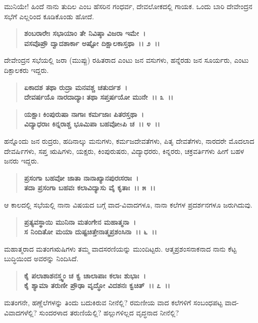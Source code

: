 ಮುನಿಯೇ! ಹಿಂದೆ ನಾನು ತುದಿಲ ಎಂಬ ಹೆಸರಿನ ಗಂಧರ್ವ, ದೇವಲೋಕದಲ್ಲಿ ಗಾಯಕ. ಒಂದು ಬಾರಿ ದೇವೇಂದ್ರನ ಸಭೆಗೆ ಎಲ್ಲರಿಂದ ಕೂಡಿಕೊಂಡು ಹೋದೆ.

\begin{verse}
\textbf{ಶಂಬರಾರೇಃ ಸಭಾಯಾಂ ತೇ ನಿವಿಷ್ಠಾ ವಿಜರಾ ಇಮೇ~।}\\\textbf{ವಸವೊಪ್ರೌ ದ್ವಾದಶಾರ್ಕಾ ಅಷ್ಟೋ ದಿಕ್ಷಾಲಕಾಸ್ತಥಾ~।। ೨~।। }
\end{verse}

ದೇವೇಂದ್ರನ ಸಭೆಯಲ್ಲಿ ಜರಾ (ಮುಪ್ಪು) ರಹಿತರಾದ ಎಂಟು ಜನ ವಸುಗಳು, ಹನ್ನೆರಡು ಜನ ಸೂರ್ಯರು, ಎಂಟು ದಿಕ್ಪಾಲಕರು ಇದ್ದರು.

\begin{verse}
\textbf{ಏಕಾದಶ ತಥಾ ರುದ್ರಾ ಮನವಶ್ಚ ಚತುರ್ದಶ~।}\\\textbf{ದೇವರ್ಷಯೊ ನಾರದಾದ್ಯಾಃ ತಥಾ ಸಪ್ತರ್ಷಯೋ ಮುನೇ~।। ೩~।। }
\end{verse}

\begin{verse}
\textbf{ಯಕ್ಷಾಃ ಕಿಂಪುರುಷಾ ನಾಗಾಃ ಕರ್ಮಜಾಃ ಪಿತರಸ್ತಥಾ~।}\\\textbf{ವಿದ್ಯಾಧರಾಃ ಕಿನ್ನರಾಶ್ಚ ಭೂಮಿಪಾ ಬಹವೋsಪಿ ಚ~।। ೪~।। }
\end{verse}

ಹನ್ನೊಂದು ಜನ ರುದ್ರರು, ಹದಿನಾಲ್ಕು ಮನುಗಳು, ಕರ್ಮಜದೇವತೆಗಳು, ಪಿತೃ ದೇವತೆಗಳು, ನಾರದರೇ ಮೊದಲಾದ ದೇವಷಿ೯ಗಳು, ಸಪ್ತ ಋಷಿಗಳು, ಯಕ್ಷರು, ಕಿಂಪುರುಷರು, ವಿದ್ಯಾಧರರು, ಕಿನ್ನರರು, ಚಕ್ರವರ್ತಿಗಳು ಹೀಗೆ ಬಹಳ ಜನರು ಇದ್ದರು.

\begin{verse}
\textbf{ಪ್ರಸಂಗಾ ಬಹವೋ ಜಾತಾ ನಾನಾಖ್ಯಾನಪುರಃಸರಾಃ~।}\\\textbf{ತದಾ ಪ್ರಸಂಗಾ ಬಹವಃ ಕಲಾವಿದ್ಯಾಸು ವೈ ಕೃತಾಃ~।। ೫~।।} 
\end{verse}

ಆ ಕಾಲದಲ್ಲಿ ಸಭೆಯಲ್ಲಿ ನಾನಾ ವಿಷಯದ ಬಗ್ಗೆ ವಾದ-ವಿವಾದಗಳೂ, ನಾನಾ ಕಲೆಗಳ ಪ್ರದರ್ಶನಗಳೂ ಜರುಗಿದುವು.

\begin{verse}
\textbf{ಪ್ರತ್ಯವಸ್ಥಾಯಿ ಮುನಿನಾ ಮತಂಗೇನ ಮಹಾತ್ಮನಾ~।}\\\textbf{ಸ ನಿಂದಿತೋ ಮಯಾ ದುಷ್ಟಚಿತ್ತೇನಾತ್ಮಪ್ರಶಂಸಿನಾ~।। ೬~।। }
\end{verse}

ಮಹಾತ್ಮರಾದ ಮತಂಗಋಷಿಗಳು ತಮ್ಮ ವಾದಸರಣಿಯನ್ನು ಮುಂದಿಟ್ಟರು. ಆತ್ಮಪ್ರಶಂಸ\-ನಾಕನಾದ ನಾನು ಕೆಟ್ಟ ಬುದ್ಧಿಯಿಂದ ಅವರನ್ನು ನಿಂದಿಸಿದೆ.

\begin{verse}
\textbf{ಕೈ ಪಲಾಶಾಶನಸ್ತ್ವಂ ಚ ಕ್ವ ಚಾಲಾಪಾಃ ಕಲಾಃ ಶುಭಾಃ~।}\\\textbf{ಕೈ ಶ್ಯಾಮಾ ತರುಣೀ ಪ್ರೌಢಾ ವೃದ್ಧೋ ವಿದಶನಃ ಕ್ವಚಿತ್~।। ೭~।। }
\end{verse}

ಮತಂಗನೇ, ಹಣ್ಣೆಲೆಗಳನ್ನು ತಿಂದು ಬದುಕಿರುವ ನೀನೆಲ್ಲಿ? ರಮಣೀಯ ವಾದ ಕಲೆಗಳಿಗೆ ಸಂಬಂಧಪಟ್ಟ ವಾದ-ವಿವಾದಗಳೆಲ್ಲಿ? ಸುಂದರಳಾದ ತರುಣಿಯೆಲ್ಲಿ? ಹಲ್ಲುಗಳಿಲ್ಲದ ವೃದ್ಧನಾದ ನೀನೆಲ್ಲಿ?


